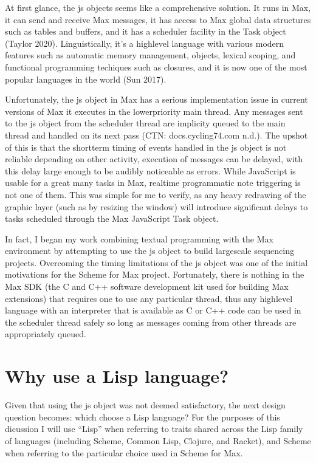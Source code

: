 \documentclass[letterpaper,10pt,english]{sphinxmanual}
\begin{document}
\sphinxAtStartPar
At first glance, the js objects seems like a comprehensive solution.
It runs in Max, it can send and receive Max messages, it has access to Max global data structures such as tables and buffers,
and it has a scheduler facility in the Task object (Taylor 2020).
Linguistically, it’s a high\sphinxhyphen{}level language with various modern features such as automatic memory management,
objects, lexical scoping, and functional programming techiques such as closures, and it is now one of the most popular
languages in the world (Sun 2017).

\sphinxAtStartPar
Unfortunately, the js object in Max has a serious implementation issue \sphinxhyphen{} in current versions of Max it  executes in the
lower\sphinxhyphen{}priority main thread.  Any messages sent to the js object from the scheduler thread are implicity queued to the
main thread and handled on its next pass (CTN: docs.cycling74.com n.d.).
The upshot of this is that the short\sphinxhyphen{}term timing of events handled in the js object is not reliable \sphinxhyphen{}
depending on other activity, execution of messages can be delayed, with this delay large enough to be audibly noticeable as errors.
While JavaScript is usable for a great many tasks in Max, realtime programmatic note triggering is not one of them.
This was simple for me to verify, as any heavy redrawing of the graphic layer (such as by resizing the window) will
introduce significant delays to tasks scheduled through the Max JavaScript Task object.

\sphinxAtStartPar
In fact, I began my work combining textual programming with the Max environment by attempting to use the js object
to build large\sphinxhyphen{}scale sequencing projects.
Overcoming the timing limitations of the js object was one of the initial motivations for the Scheme for Max project.
Fortunately, there is nothing in the Max SDK (the C and C++ software development kit used for building Max extensions) that requires
one to use any particular thread, thus any high\sphinxhyphen{}level language with an interpreter that is available as C or C++ code
can be used in the scheduler thread safely so long as messages coming from other threads are appropriately queued.


\section{Why use a Lisp language?}
\label{\detokenize{design:why-use-a-lisp-language}}
\sphinxAtStartPar
Given that using the js object was not deemed satisfactory, the next design question becomes:
which choose a Lisp language?
For the purposes of this dicussion I will use “Lisp” when referring to traits shared across the Lisp family of languages
(including Scheme, Common Lisp, Clojure, and Racket), and Scheme when referring to the particular choice used in Scheme for Max.
\end{document}
